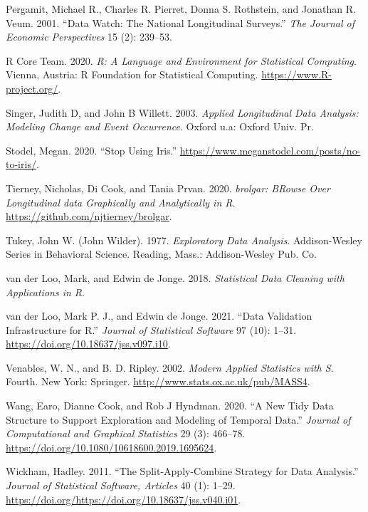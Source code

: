 \documentclass[12pt]{article}
\begin{document}
\leavevmode\hypertarget{ref-MichaelRPergamit2001DWTN}{}%
Pergamit, Michael R., Charles R. Pierret, Donna S. Rothstein, and Jonathan R. Veum. 2001. ``Data Watch: The National Longitudinal Surveys.'' \emph{The Journal of Economic Perspectives} 15 (2): 239--53.

\leavevmode\hypertarget{ref-R}{}%
R Core Team. 2020. \emph{R: A Language and Environment for Statistical Computing}. Vienna, Austria: R Foundation for Statistical Computing. \url{https://www.R-project.org/}.

\leavevmode\hypertarget{ref-SingerJudithD2003Alda}{}%
Singer, Judith D, and John B Willett. 2003. \emph{Applied Longitudinal Data Analysis: Modeling Change and Event Occurrence}. Oxford u.a: Oxford Univ. Pr.

\leavevmode\hypertarget{ref-notiris}{}%
Stodel, Megan. 2020. ``Stop Using Iris.'' \url{https://www.meganstodel.com/posts/no-to-iris/}.

\leavevmode\hypertarget{ref-brolgar}{}%
Tierney, Nicholas, Di Cook, and Tania Prvan. 2020. \emph{brolgar: BRowse Over Longitudinal data Graphically and Analytically in R}. \url{https://github.com/njtierney/brolgar}.

\leavevmode\hypertarget{ref-tukey}{}%
Tukey, John W. (John Wilder). 1977. \emph{Exploratory Data Analysis}. Addison-Wesley Series in Behavioral Science. Reading, Mass.: Addison-Wesley Pub. Co.

\leavevmode\hypertarget{ref-LooMarkvander2018Sdcw}{}%
van der Loo, Mark, and Edwin de Jonge. 2018. \emph{Statistical Data Cleaning with Applications in R}.

\leavevmode\hypertarget{ref-validate}{}%
van der Loo, Mark P. J., and Edwin de Jonge. 2021. ``Data Validation Infrastructure for R.'' \emph{Journal of Statistical Software} 97 (10): 1--31. \url{https://doi.org/10.18637/jss.v097.i10}.

\leavevmode\hypertarget{ref-mass}{}%
Venables, W. N., and B. D. Ripley. 2002. \emph{Modern Applied Statistics with S}. Fourth. New York: Springer. \url{http://www.stats.ox.ac.uk/pub/MASS4}.

\leavevmode\hypertarget{ref-tsibble}{}%
Wang, Earo, Dianne Cook, and Rob J Hyndman. 2020. ``A New Tidy Data Structure to Support Exploration and Modeling of Temporal Data.'' \emph{Journal of Computational and Graphical Statistics} 29 (3): 466--78. \url{https://doi.org/10.1080/10618600.2019.1695624}.

\leavevmode\hypertarget{ref-plyr}{}%
Wickham, Hadley. 2011. ``The Split-Apply-Combine Strategy for Data Analysis.'' \emph{Journal of Statistical Software, Articles} 40 (1): 1--29. \url{https://doi.org/https://doi.org/10.18637/jss.v040.i01}.
\end{document}
